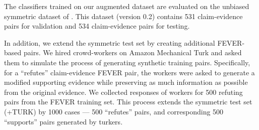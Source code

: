 \documentclass[letterpaper]{article} %
\begin{document}
The classifiers trained on our augmented dataset are evaluated on the unbiased symmetric dataset of \cite{schuster2019towards}. This dataset (version 0.2) contains 531 claim-evidence pairs for validation and 534 claim-evidence pairs for testing. 


In addition, we extend the symmetric test set by creating additional FEVER-based pairs.
We hired crowd-workers on Amazon Mechanical Turk and asked them to simulate the process of generating synthetic training pairs. Specifically, for a ``refutes'' claim-evidence FEVER pair, the workers were asked to generate a modified supporting evidence while preserving as much information as possible from the original evidence. We collected responses of workers for 500 refuting pairs from the FEVER training set. 
This process extends the symmetric test set (\textsc{+TURK}) by 1000 cases --- 500 ``refutes'' pairs, and corresponding 500 ``supports'' pairs generated by turkers.
\end{document}
